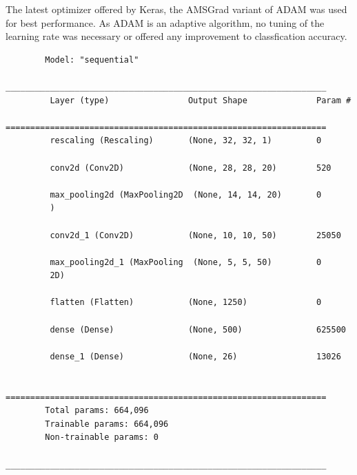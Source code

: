 \documentclass[a4paper]{exam}
\begin{document}
\begin{questions}
    The latest optimizer offered by Keras, the AMSGrad variant of ADAM was used for best performance. 
    As ADAM is an adaptive algorithm, no tuning of the learning rate was necessary or offered any improvement to classfication accuracy.

    \begin{footnotesize}
        \begin{verbatim}
        Model: "sequential"
        _________________________________________________________________
         Layer (type)                Output Shape              Param #   
        =================================================================
         rescaling (Rescaling)       (None, 32, 32, 1)         0         
                                                                         
         conv2d (Conv2D)             (None, 28, 28, 20)        520       
                                                                         
         max_pooling2d (MaxPooling2D  (None, 14, 14, 20)       0         
         )                                                               
                                                                         
         conv2d_1 (Conv2D)           (None, 10, 10, 50)        25050     
                                                                         
         max_pooling2d_1 (MaxPooling  (None, 5, 5, 50)         0         
         2D)                                                             
                                                                         
         flatten (Flatten)           (None, 1250)              0         
                                                                         
         dense (Dense)               (None, 500)               625500    
                                                                         
         dense_1 (Dense)             (None, 26)                13026     
                                                                         
        =================================================================
        Total params: 664,096
        Trainable params: 664,096
        Non-trainable params: 0
        _________________________________________________________________
    \end{verbatim}
    \end{footnotesize}



\end{questions}
\end{document}
